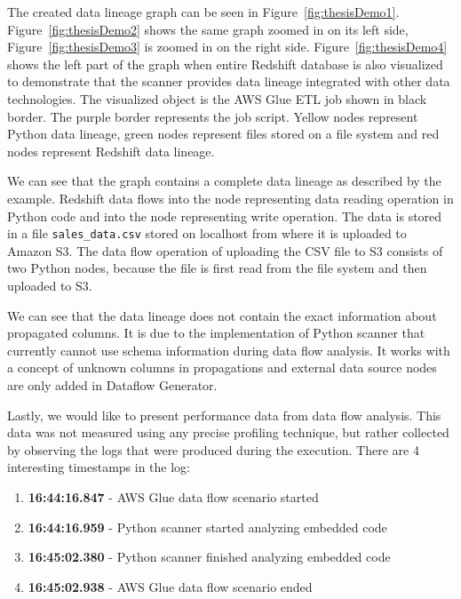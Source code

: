\par
The created data lineage graph can be seen in Figure~\ref{fig:thesisDemo1}. Figure~\ref{fig:thesisDemo2} shows the same graph zoomed in on its left side, Figure~\ref{fig:thesisDemo3} is zoomed in on the right side. Figure~\ref{fig:thesisDemo4} shows the left part of the graph when entire Redshift database is also visualized to demonstrate that the scanner provides data lineage integrated with other data technologies. The visualized object is the AWS Glue ETL job shown in black border. The purple border represents the job script. Yellow nodes represent Python data lineage, green nodes represent files stored on a file system and red nodes represent Redshift data lineage.
\par
We can see that the graph contains a complete data lineage as described by the example. Redshift data flows into the node representing data reading operation in Python code and into the node representing write operation. The data is stored in a file \texttt{sales\_data.csv} stored on localhost from where it is uploaded to Amazon S3. The data flow operation of uploading the CSV file to S3 consists of two Python nodes, because the file is first read from the file system and then uploaded to S3.
\par
We can see that the data lineage does not contain the exact information about propagated columns. It is due to the implementation of Python scanner that currently cannot use schema information during data flow analysis. It works with a concept of unknown columns in propagations and external data source nodes are only added in Dataflow Generator.
\par
Lastly, we would like to present performance data from data flow analysis. This data was not measured using any precise profiling technique, but rather collected by observing the logs that were produced during the execution. There are 4 interesting timestamps in the log:
\begin{enumerate}
    \item \textbf{16:44:16.847} - AWS Glue data flow scenario started
    \item \textbf{16:44:16.959} - Python scanner started analyzing embedded code
    \item \textbf{16:45:02.380} - Python scanner finished analyzing embedded code
    \item \textbf{16:45:02.938} - AWS Glue data flow scenario ended
\end{enumerate}
